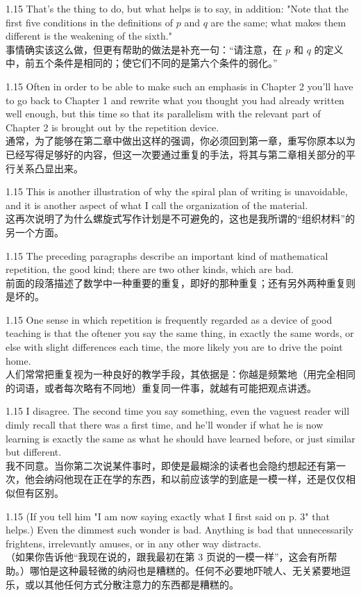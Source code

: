 \documentclass[12pt,a4paper]{article}
\newcommand{\bilingual}[2]{
    \begin{spacing}{1.15} %
        \noindent \normalsize #1 \\[-0.5ex] %
        \small \textcolor{blue!70!black}{#2} %
    \end{spacing}
    \vspace{0.8em} %
}
\begin{document}
\bilingual{That's the thing to do, but what helps is to say, in addition: "Note that the first five conditions in the definitions of $p$ and $q$ are the same; what makes them different is the weakening of the sixth."}
{事情确实该这么做，但更有帮助的做法是补充一句：“请注意，在 $p$ 和 $q$ 的定义中，前五个条件是相同的；使它们不同的是第六个条件的弱化。”} %

\bilingual{Often in order to be able to make such an emphasis in Chapter 2 you'll have to go back to Chapter 1 and rewrite what you thought you had already written well enough, but this time so that its parallelism with the relevant part of Chapter 2 is brought out by the repetition device.}
{通常，为了能够在第二章中做出这样的强调，你必须回到第一章，重写你原本以为已经写得足够好的内容，但这一次要通过重复的手法，将其与第二章相关部分的平行关系凸显出来。} %

\bilingual{This is another illustration of why the spiral plan of writing is unavoidable, and it is another aspect of what I call the organization of the material.}
{这再次说明了为什么螺旋式写作计划是不可避免的，这也是我所谓的“组织材料”的另一个方面。} %

\bilingual{The preceding paragraphs describe an important kind of mathematical repetition, the good kind; there are two other kinds, which are bad.}
{前面的段落描述了数学中一种重要的重复，即好的那种重复；还有另外两种重复则是坏的。} %

\bilingual{One sense in which repetition is frequently regarded as a device of good teaching is that the oftener you say the same thing, in exactly the same words, or else with slight differences each time, the more likely you are to drive the point home.}
{人们常常把重复视为一种良好的教学手段，其依据是：你越是频繁地（用完全相同的词语，或者每次略有不同地）重复同一件事，就越有可能把观点讲透。} %

\bilingual{I disagree. The second time you say something, even the vaguest reader will dimly recall that there was a first time, and he'll wonder if what he is now learning is exactly the same as what he should have learned before, or just similar but different.}
{我不同意。当你第二次说某件事时，即使是最糊涂的读者也会隐约想起还有第一次，他会纳闷他现在正在学的东西，和以前应该学的到底是一模一样，还是仅仅相似但有区别。} %

\bilingual{(If you tell him "I am now saying exactly what I first said on p. 3" that helps.) Even the dimmest such wonder is bad. Anything is bad that unnecessarily frightens, irrelevantly amuses, or in any other way distracts.}
{（如果你告诉他“我现在说的，跟我最初在第 3 页说的一模一样”，这会有所帮助。）哪怕是这种最轻微的纳闷也是糟糕的。任何不必要地吓唬人、无关紧要地逗乐，或以其他任何方式分散注意力的东西都是糟糕的。} %
\end{document}
